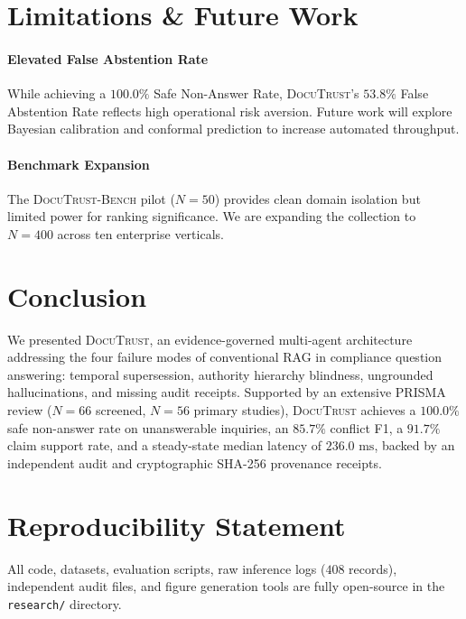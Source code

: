 \documentclass[journal,twoside]{IEEEtran}
\newcommand{\sysname}{\textsc{DocuTrust}}
\newcommand{\bench}{\textsc{DocuTrust-Bench}}
\begin{document}
\section{Limitations \& Future Work}
\label{sec:limits}

\paragraph{Elevated False Abstention Rate}
While achieving a $100.0\%$ Safe Non-Answer Rate, \sysname{}'s $53.8\%$ False Abstention Rate reflects high operational risk aversion.
Future work will explore Bayesian calibration and conformal prediction to increase automated throughput.

\paragraph{Benchmark Expansion}
The \bench{} pilot ($N=50$) provides clean domain isolation but limited power for ranking significance. We are expanding the collection to $N=400$ across ten enterprise verticals.

\section{Conclusion}
\label{sec:conclusion}

We presented \sysname{}, an evidence-governed multi-agent architecture addressing the four failure modes of conventional RAG in compliance question answering: temporal supersession, authority hierarchy blindness, ungrounded hallucinations, and missing audit receipts.
Supported by an extensive PRISMA review ($N=66$ screened, $N=56$ primary studies), \sysname{} achieves a $100.0\%$ safe non-answer rate on unanswerable inquiries, an $85.7\%$ conflict F1, a $91.7\%$ claim support rate, and a steady-state median latency of $236.0\text{ ms}$, backed by an independent audit and cryptographic SHA-256 provenance receipts.

\section*{Reproducibility Statement}
All code, datasets, evaluation scripts, raw inference logs ($408$ records), independent audit files, and figure generation tools are fully open-source in the \texttt{research/} directory.



\end{document}
